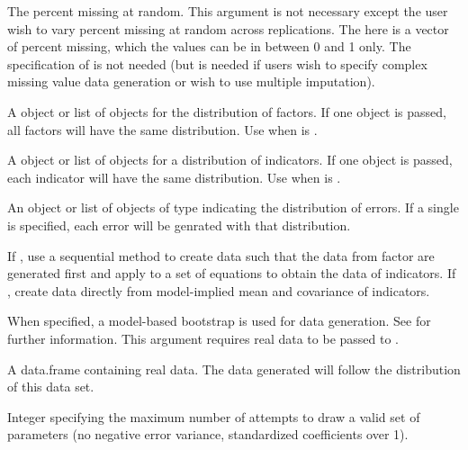 \documentclass[a4paper]{book}
\begin{document}
\begin{Arguments}
\begin{ldescription}
\item[\code{pmMAR}] 
The percent missing at random. This argument is not necessary except the user wish to vary percent missing at random across replications. The  here is a vector of percent missing, which the values can be in between 0 and 1 only. The specification of  is not needed (but is needed if users wish to specify complex missing value data generation or wish to use multiple imputation). 


\item[\code{facDist}]  
A  object or list of objects for the distribution of factors. If one object is passed, all factors will have the same distribution. Use when  is .

\item[\code{indDist}]  
A  object or list of objects for a distribution of indicators. If one object is passed, each indicator will have the same distribution. Use when  is .

\item[\code{errorDist}]  
An object or list of objects of type  indicating the distribution of errors. If a single  is specified, each error will be genrated with that distribution.

\item[\code{sequential}]  
If , use a sequential method to create data such that the data from factor are generated first and apply to a set of equations to obtain the data of indicators. If , create data directly from model-implied mean and covariance of indicators.

\item[\code{modelBoot}]  
When specified, a model-based bootstrap is used for data generation. See  for further information. This argument requires real data to be passed to .

\item[\code{realData}]  
A data.frame containing real data. The data generated will follow the distribution of this data set.

\item[\code{maxDraw}]  
Integer specifying the maximum number of attempts to draw a valid set of parameters (no negative error variance, standardized coefficients over 1).


\end{ldescription}
\end{Arguments}
\end{document}
